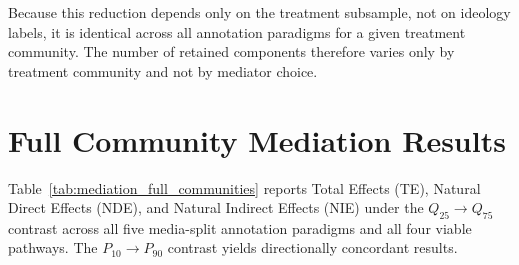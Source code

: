 Because this reduction depends only on the treatment subsample, not on ideology labels, it is identical across all annotation paradigms for a given treatment community. The number of retained components therefore varies only by treatment community and not by mediator choice.

\section{Full Community Mediation Results}

Table~\ref{tab:mediation_full_communities} reports Total Effects (TE), Natural Direct Effects (NDE), and Natural Indirect Effects (NIE) under the $Q_{25} \to Q_{75}$ contrast across all five media-split annotation paradigms and all four viable pathways. The $P_{10} \to P_{90}$ contrast yields directionally concordant results.

